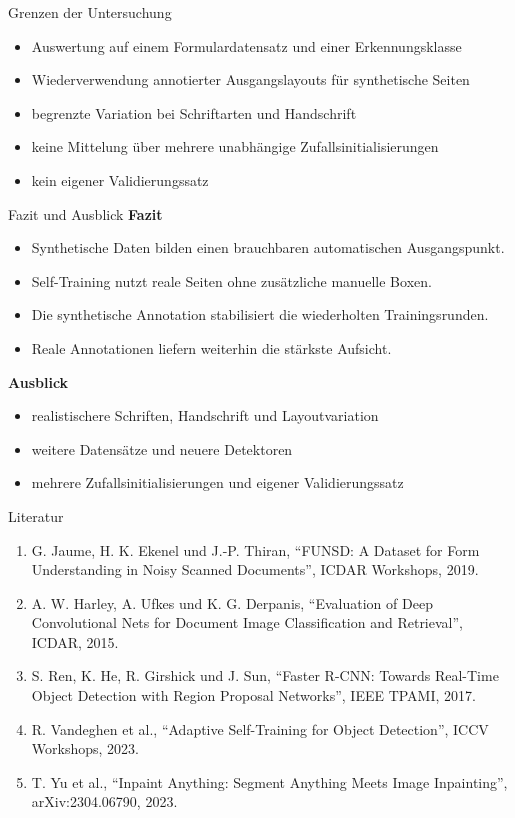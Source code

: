 \documentclass[aspectratio=1610,10pt]{beamer}
\begin{document}
\begin{frame}{Grenzen der Untersuchung}
\begin{itemize}
  \item Auswertung auf einem Formulardatensatz und einer Erkennungsklasse
  \item Wiederverwendung annotierter Ausgangslayouts für synthetische Seiten
  \item begrenzte Variation bei Schriftarten und Handschrift
  \item keine Mittelung über mehrere unabhängige Zufallsinitialisierungen
  \item kein eigener Validierungssatz
\end{itemize}
\end{frame}

\begin{frame}{Fazit und Ausblick}
\textbf{Fazit}
\begin{itemize}
  \item Synthetische Daten bilden einen brauchbaren automatischen Ausgangspunkt.
  \item Self-Training nutzt reale Seiten ohne zusätzliche manuelle Boxen.
  \item Die synthetische Annotation stabilisiert die wiederholten Trainingsrunden.
  \item Reale Annotationen liefern weiterhin die stärkste Aufsicht.
\end{itemize}

\vspace{0.45em}
\textbf{Ausblick}
\begin{itemize}
  \item realistischere Schriften, Handschrift und Layoutvariation
  \item weitere Datensätze und neuere Detektoren
  \item mehrere Zufallsinitialisierungen und eigener Validierungssatz
\end{itemize}
\end{frame}

\begin{frame}{Literatur}
\footnotesize
\begin{enumerate}
  \item G. Jaume, H. K. Ekenel und J.-P. Thiran, ``FUNSD: A Dataset for Form Understanding in Noisy Scanned Documents'', ICDAR Workshops, 2019.
  \item A. W. Harley, A. Ufkes und K. G. Derpanis, ``Evaluation of Deep Convolutional Nets for Document Image Classification and Retrieval'', ICDAR, 2015.
  \item S. Ren, K. He, R. Girshick und J. Sun, ``Faster R-CNN: Towards Real-Time Object Detection with Region Proposal Networks'', IEEE TPAMI, 2017.
  \item R. Vandeghen et al., ``Adaptive Self-Training for Object Detection'', ICCV Workshops, 2023.
  \item T. Yu et al., ``Inpaint Anything: Segment Anything Meets Image Inpainting'', arXiv:2304.06790, 2023.
\end{enumerate}
\end{frame}
\end{document}
